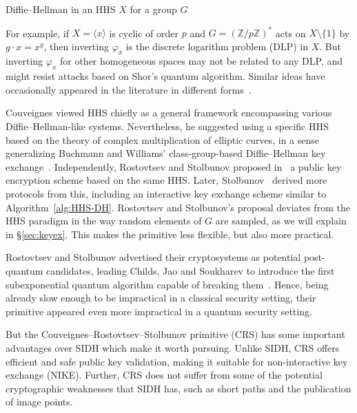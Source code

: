 \documentclass{llncs}
\newcommand{\Z}{\mathbb{Z}}
\begin{document}
\begin{algorithm}
    \caption{Diffie--Hellman in an HHS $X$ for a group $G$}
    \label{alg:HHS-DH}
\end{algorithm}


For example, if $X=\langle{x}\rangle$ is cyclic of order $p$ 
and $G=(\Z/p\Z)^*$ acts on $X\setminus\{1\}$ by
$g·x=x^g$, then inverting $φ_x$ is the discrete logarithm problem (DLP) in $X$.
But inverting $φ_x$ for other homogeneous spaces may not be related
to any DLP,
and might resist attacks based on Shor's quantum algorithm.
Similar ideas have occasionally appeared in the
literature in different forms~\cite{10.1007/3-540-44598-6_10,monico2007}.

Couveignes viewed HHS chiefly as a general framework encompassing
various Diffie--Hellman-like systems. Nevertheless, he
suggested using a specific HHS based on the theory of complex
multiplication of elliptic curves, in a sense generalizing 
Buchmann and Williams'
class-group-based Diffie--Hellman key exchange~\cite{Buchmann1988}.
Independently, Rostovtsev
and Stolbunov proposed in~\cite{rostovtsev+stolbunov06} a public key
encryption scheme based on the same HHS. Later, Stolbunov~\cite{Stol}
derived more protocols from this, including an interactive
key exchange scheme similar to Algorithm~\ref{alg:HHS-DH}.  Rostovtsev
and Stolbunov's proposal deviates from the HHS paradigm in
the way random elements of $G$ are sampled, as we will explain in
\S\ref{sec:keyex}. This makes the primitive less flexible, but
also more practical.

Rostovtsev and Stolbunov advertised their cryptosystems as potential
post-quantum candidates, leading Childs, Jao and Soukharev to introduce
the first subexponential quantum algorithm capable of breaking
them~\cite{childs2014constructing}. 
Hence, being already slow enough to
be impractical in a classical security setting, their
primitive appeared even more impractical in a quantum
security setting. 

But the Couveignes--Rostovtsev--Stolbunov primitive (CRS)
has some important advantages over SIDH which make it worth pursuing.
Unlike SIDH, 
CRS offers efficient and safe public key validation,
making it suitable for non-interactive key exchange (NIKE).
Further, CRS does not suffer from 
some of the potential cryptographic weaknesses that SIDH has,
such as short paths and the publication of image points.
\end{document}
